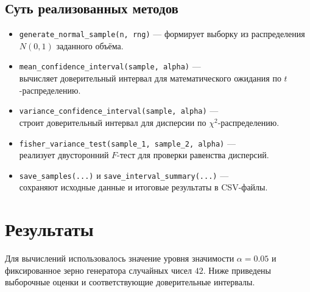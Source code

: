 \documentclass[a4paper, 14pt]{extarticle}
\begin{document}
\subsection{Суть реализованных методов}

\begin{itemize}
    \item \texttt{generate\_normal\_sample(n, rng)} --- формирует выборку из распределения $N(0,1)$ заданного объёма.
    \item \texttt{mean\_confidence\_interval(sample, alpha)} ---\\ вычисляет доверительный интервал для математического ожидания по $t$-распределению.
    \item \texttt{variance\_confidence\_interval(sample, alpha)} ---\\ строит доверительный интервал для дисперсии по $\chi^2$-распределению.
    \item \texttt{fisher\_variance\_test(sample\_1, sample\_2, alpha)} ---\\ реализует двусторонний $F$-тест для проверки равенства дисперсий.
    \item \texttt{save\_samples(...)} и \texttt{save\_interval\_summary(...)} ---\\ сохраняют исходные данные и итоговые результаты в CSV-файлы.
\end{itemize}

\section{Результаты}

Для вычислений использовалось значение уровня значимости $\alpha = 0.05$ и фиксированное зерно генератора случайных чисел $42$. Ниже приведены выборочные оценки и соответствующие доверительные интервалы.

\begin{table}[H]
    \centering
    \caption{Доверительные интервалы для параметров двух выборок из $N(0,1)$}
    \label{tab:ci_summary}
\end{table}
\end{document}

